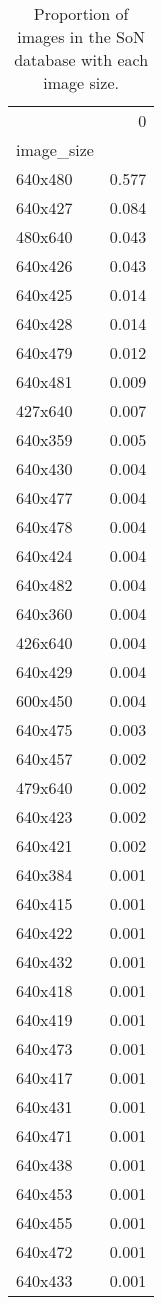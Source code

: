 \begin{table}
\caption{Proportion of images in the SoN database with each image size.}
\label{tab:SoNImageSizes}
\begin{tabular}{lr}
\toprule
 & 0 \\
image_size &  \\
\midrule
640x480 & 0.577 \\
640x427 & 0.084 \\
480x640 & 0.043 \\
640x426 & 0.043 \\
640x425 & 0.014 \\
640x428 & 0.014 \\
640x479 & 0.012 \\
640x481 & 0.009 \\
427x640 & 0.007 \\
640x359 & 0.005 \\
640x430 & 0.004 \\
640x477 & 0.004 \\
640x478 & 0.004 \\
640x424 & 0.004 \\
640x482 & 0.004 \\
640x360 & 0.004 \\
426x640 & 0.004 \\
640x429 & 0.004 \\
600x450 & 0.004 \\
640x475 & 0.003 \\
640x457 & 0.002 \\
479x640 & 0.002 \\
640x423 & 0.002 \\
640x421 & 0.002 \\
640x384 & 0.001 \\
640x415 & 0.001 \\
640x422 & 0.001 \\
640x432 & 0.001 \\
640x418 & 0.001 \\
640x419 & 0.001 \\
640x473 & 0.001 \\
640x417 & 0.001 \\
640x431 & 0.001 \\
640x471 & 0.001 \\
640x438 & 0.001 \\
640x453 & 0.001 \\
640x455 & 0.001 \\
640x472 & 0.001 \\
640x433 & 0.001 \\

\end{tabular}
\end{table}

